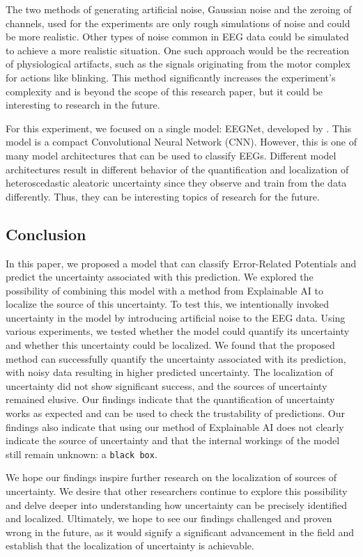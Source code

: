 The two methods of generating artificial noise, Gaussian noise and the zeroing of channels, used for the experiments are only rough simulations of noise and could be more realistic. Other types of noise common in EEG data could be simulated to achieve a more realistic situation. One such approach would be the recreation of physiological artifacts, such as the signals originating from the motor complex for actions like blinking. This method significantly increases the experiment's complexity and is beyond the scope of this research paper, but it could be interesting to research in the future.

For this experiment, we focused on a single model: EEGNet, developed by \cite{lawhern2018eegnet}. This model is a compact Convolutional Neural Network (CNN). However, this is one of many model architectures that can be used to classify EEGs. Different model architectures result in different behavior of the quantification and localization of heteroscedastic aleatoric uncertainty since they observe and train from the data differently. Thus, they can be interesting topics of research for the future.
\subsection{Conclusion}

In this paper, we proposed a model that can classify Error-Related Potentials and predict the uncertainty associated with this prediction. We explored the possibility of combining this model with a method from Explainable AI to localize the source of this uncertainty. To test this, we intentionally invoked uncertainty in the model by introducing artificial noise to the EEG data. Using various experiments, we tested whether the model could quantify its uncertainty and whether this uncertainty could be localized. We found that the proposed method can successfully quantify the uncertainty associated with its prediction, with noisy data resulting in higher predicted uncertainty. The localization of uncertainty did not show significant success, and the sources of uncertainty remained elusive. Our findings indicate that the quantification of uncertainty works as expected and can be used to check the trustability of predictions. Our findings also indicate that using our method of Explainable AI does not clearly indicate the source of uncertainty and that the internal workings of the model still remain unknown: a \verb|black box|.

We hope our findings inspire further research on the localization of sources of uncertainty. We desire that other researchers continue to explore this possibility and delve deeper into understanding how uncertainty can be precisely identified and localized. Ultimately, we hope to see our findings challenged and proven wrong in the future, as it would signify a significant advancement in the field and establish that the localization of uncertainty is achievable.

